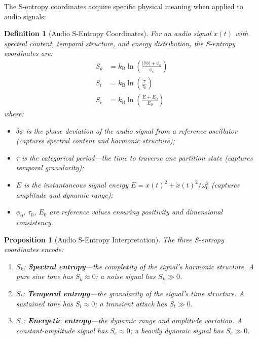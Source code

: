 \documentclass[twocolumn,10pt]{article}
\newtheorem{proposition}[theorem]{Proposition}
\newtheorem{definition}[theorem]{Definition}
\theoremstyle{remark}
\newcommand{\kB}{k_{\mathrm{B}}}
\newcommand{\Sk}{S_k}
\newcommand{\St}{S_t}
\newcommand{\Se}{S_e}
\begin{document}
The S-entropy coordinates acquire specific physical meaning when applied to audio signals:

\begin{definition}[Audio S-Entropy Coordinates]
\label{def:audio_s_entropy}
For an audio signal $x(t)$ with spectral content, temporal structure, and energy distribution, the S-entropy coordinates are:
\begin{align}
    \Sk &= \kB \ln\!\left(\frac{|\delta\phi| + \phi_0}{\phi_0}\right) \label{eq:Sk_audio} \\
    \St &= \kB \ln\!\left(\frac{\tau}{\tau_0}\right) \label{eq:St_audio} \\
    \Se &= \kB \ln\!\left(\frac{E + E_0}{E_0}\right) \label{eq:Se_audio}
\end{align}
where:
\begin{itemize}
    \item $\delta\phi$ is the phase deviation of the audio signal from a reference oscillator (captures spectral content and harmonic structure);
    \item $\tau$ is the categorical period---the time to traverse one partition state (captures temporal granularity);
    \item $E$ is the instantaneous signal energy $E = x(t)^2 + \dot{x}(t)^2/\omega_0^2$ (captures amplitude and dynamic range);
    \item $\phi_0$, $\tau_0$, $E_0$ are reference values ensuring positivity and dimensional consistency.
\end{itemize}
\end{definition}

\begin{proposition}[Audio S-Entropy Interpretation]
\label{prop:s_entropy_interpretation}
The three S-entropy coordinates encode:
\begin{enumerate}
    \item $\Sk$: \textbf{Spectral entropy}---the complexity of the signal's harmonic structure. A pure sine tone has $\Sk \approx 0$; a noise signal has $\Sk \gg 0$.
    \item $\St$: \textbf{Temporal entropy}---the granularity of the signal's time structure. A sustained tone has $\St \approx 0$; a transient attack has $\St \gg 0$.
    \item $\Se$: \textbf{Energetic entropy}---the dynamic range and amplitude variation. A constant-amplitude signal has $\Se \approx 0$; a heavily dynamic signal has $\Se \gg 0$.
\end{enumerate}
\end{proposition}
\end{document}

